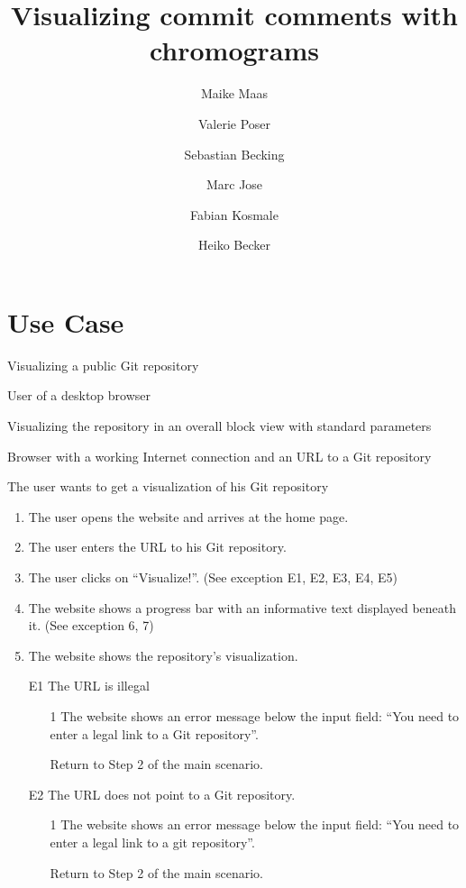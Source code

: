 \documentclass[11pt]{scrartcl}
\author{Maike Maas \and Valerie Poser \and Sebastian Becking \and
        Marc Jose \and Fabian Kosmale \and Heiko Becker}
\title{Visualizing commit comments with chromograms}
\begin{document}
\maketitle

\section{Use Case}
\begin{description}[leftmargin=!,labelwidth=\widthof{\bfseries Frequency of use:}]
	\item[Use-case:] Visualizing a public Git repository 
	\item[Primary actor:] User of a desktop browser 
	\item[Goal in context:] Visualizing the repository in an overall block view with standard parameters 
	\item[Preconditions:] Browser with a working Internet connection and an URL to a Git repository
	\item[Trigger:] The user wants to get a visualization of his Git repository 

	\item[Scenario:]
		\begin{enumerate}[leftmargin=1.5em]
			\item The user opens the website and arrives at the home page.
			\item The user enters the URL to his Git repository. 
			\item The user clicks on \enquote{Visualize!}. (See exception E1, E2, E3, E4, E5)
			\item The website shows a progress bar with an
				informative text displayed beneath
				it. (See exception 6, 7)
			\item The website shows the repository's visualization.
		\end{enumerate}
	\item[Exception Flow:]
		\begin{enumerate}[leftmargin=1.5em]
			\item[E1] The URL is illegal
			\begin{enumerate}
				\item[1] The website shows an error message below the input field: \enquote{You need to enter a legal link to a Git 						repository}.
				\item[] Return to Step 2 of the main scenario.
			\end{enumerate}
			
			\item[E2] The URL does not point to a Git repository. 
				\begin{enumerate}
					\item[1] The website shows an error message below the input field: \enquote{You need to enter a legal 		
						link to a git repository}.
					\item[] Return to Step 2 of the main scenario.
				\end{enumerate}
				

\end{enumerate}
\end{description}
\end{document}
